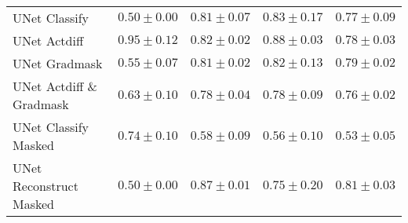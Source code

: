 \begin{tabular}{lllll}
\midrule
UNet Classify             &  $0.50\pm0.00$ &     $0.81\pm0.07$ &       $0.83\pm0.17$ &        $0.77\pm0.09$ \\
UNet Actdiff     &  $0.95\pm0.12$ &     $0.82\pm0.02$ &       $0.88\pm0.03$ &        $0.78\pm0.03$ \\
UNet Gradmask    &  $0.55\pm0.07$ &     $0.81\pm0.02$ &       $0.82\pm0.13$ &        $0.79\pm0.02$ \\
UNet Actdiff \& Gradmask     &  $0.63\pm0.10$ &     $0.78\pm0.04$ &       $0.78\pm0.09$ &        $0.76\pm0.02$ \\
UNet Classify Masked    &  $0.74\pm0.10$ &     $0.58\pm0.09$ &       $0.56\pm0.10$ &        $0.53\pm0.05$ \\
UNet Reconstruct Masked &  $0.50\pm0.00$ &     $0.87\pm0.01$ &       $0.75\pm0.20$ &        $0.81\pm0.03$ \\
\bottomrule
\end{tabular}
